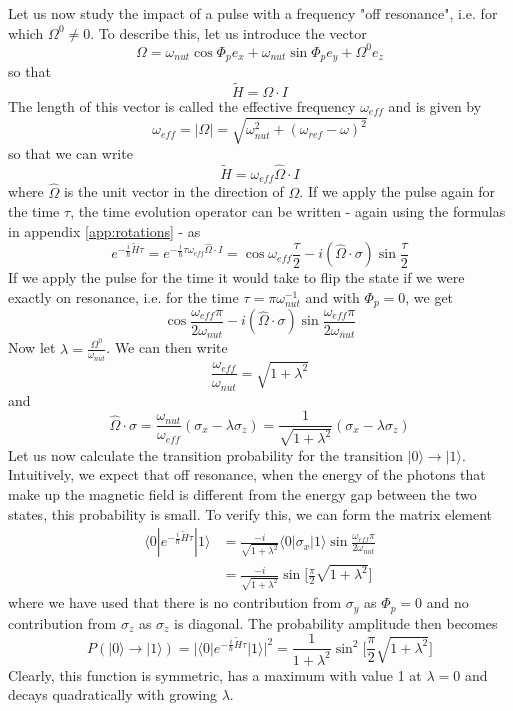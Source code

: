 \documentclass[a4paper, draft]{article}
\theoremstyle{own}
\theoremstyle{remark}
\begin{document}
Let us now study the impact of a pulse with a frequency "off resonance", i.e. for which $\Omega^0 \neq 0$. To describe this, let us introduce the vector
$$
\Omega =  \omega_{nut} \cos \Phi_p e_x  +  \omega_{nut} \sin \Phi_p e_y + \Omega^0 e_z
$$
so that 
$$
\widetilde{H} = \Omega \cdot I
$$
The length of this vector is called the effective frequency $\omega_{eff}$ and is given by
$$
\omega_{eff} = |\Omega| = \sqrt{\omega_{nut}^2 + (\omega_{ref} - \omega)^2}
$$
so that we can write
$$
\widetilde{H} = \omega_{eff} \hat{\Omega} \cdot I
$$
where $\hat{\Omega}$ is the unit vector in the direction of $\Omega$. If we apply the pulse again for the time $\tau$, the time evolution operator can be written - again using the formulas in appendix \ref{app:rotations} - as
$$
e^{-\frac{i}{\hbar} \widetilde{H} \tau} = e^{-\frac{i}{\hbar} \tau \omega_{eff} \hat{\Omega} \cdot I } = \cos \omega_{eff} \frac{\tau}{2} - i (\hat{\Omega} \cdot \sigma) \sin \frac{\tau}{2}
$$
If we apply the pulse for the time it would take to flip the state if we were exactly on resonance, i.e. for the time $\tau = \pi  \omega_{nut}^{-1}$ and with $\Phi_p = 0$, we get
$$
\cos \frac{\omega_{eff}\pi }{2\omega_{nut}} - i (\hat{\Omega} \cdot \sigma) \sin  \frac{\omega_{eff}\pi }{2\omega_{nut}}
$$
Now let $\lambda = \frac{\Omega^0}{\omega_{nut}}$. We can then write
$$
\frac{\omega_{eff}}{\omega_{nut}} = \sqrt{1+\lambda^2}
$$
and
$$
\hat{\Omega} \cdot \sigma =  \frac{\omega_{nut}}{\omega_{eff}} (\sigma_x - \lambda \sigma_z) 
=
\frac{1}{\sqrt{1+\lambda^2}} (\sigma_x - \lambda \sigma_z)
$$
Let us now calculate the transition probability for the transition $|0 \rangle \rightarrow |1 \rangle$. Intuitively, we expect that off resonance, when the energy of the photons that make up the magnetic field is different from the energy gap between the two states, this probability is small. To verify this, we can form the matrix element
\begin{align*}
\langle 0 | e^{-\frac{i}{\hbar} \widetilde{H} \tau} | 1 \rangle 
 &=
\frac{-i}{\sqrt{1+\lambda^2}}  \langle 0 | \sigma_x | 1 \rangle 
\sin  \frac{\omega_{eff}\pi }{2\omega_{nut}} \\
&= \frac{-i}{\sqrt{1+\lambda^2}} \sin  \big[ \frac{\pi}{2}\sqrt{1+\lambda^2} \big] 
\end{align*}
where we have used that there is no contribution from $\sigma_y$ as $\Phi_p = 0$ and no contribution from $\sigma_z$ as $\sigma_z$ is diagonal. The  probability amplitude then becomes
$$
P(|0 \rangle \rightarrow |1 \rangle) = | \langle 0 | e^{-\frac{i}{\hbar} \widetilde{H} \tau} | 1 \rangle |^2 = \frac{1}{1+\lambda^2} \sin^2 \big[ \frac{\pi}{2}  \sqrt{1+\lambda^2} \big] 
$$
Clearly, this function is symmetric, has a maximum with value 1 at $\lambda = 0$ and decays quadratically with growing $\lambda$. 
\end{document}
